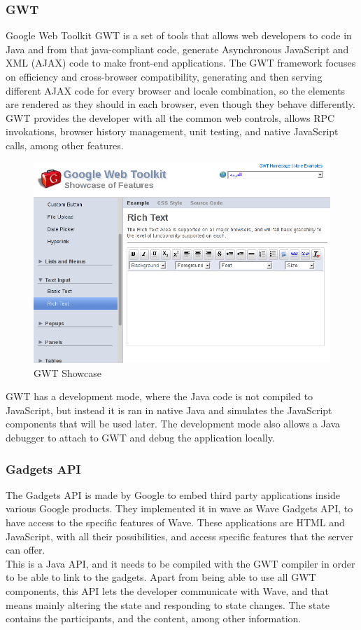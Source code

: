 \subsubsection{GWT}
Google Web Toolkit GWT is a set of tools that allows web developers to code in Java and from that java-compliant code, generate Asynchronous JavaScript and XML (AJAX) code to make front-end applications. The GWT framework focuses on efficiency and cross-browser compatibility, generating and then serving different AJAX code for every browser and locale combination, so the elements are rendered as they should in each browser, even though they behave differently. GWT provides the developer with all the common web controls, allows RPC invokations, browser history management, unit testing, and native JavaScript calls, among other features.
\begin{figure}[H]
  \center
    \includegraphics[keepaspectratio, scale=0.4]{Media/Captures/GWT/gwt_showcase.png}
  \caption{GWT Showcase}
  \label{fig:gwt_showcase}
\end{figure}
GWT has a development mode, where the Java code is not compiled to JavaScript, but instead it is ran in native Java and simulates the JavaScript components that will be used later. The development mode also allows a Java debugger to attach to GWT and debug the application locally. 

\subsubsection{Gadgets API}
The Gadgets API is made by Google to embed third party applications inside various Google products. They implemented it in wave as Wave Gadgets API, to have access to the specific features of Wave. These applications are HTML and JavaScript, with all their possibilities, and access specific features that the server can offer.\\[.2cm]
This is a Java API, and it needs to be compiled with the GWT compiler in order to be able to link to the gadgets. Apart from being able to use all GWT components, this API lets the developer communicate with Wave, and that means mainly altering the state and responding to state changes. The state contains the participants, and the content, among other information. 

